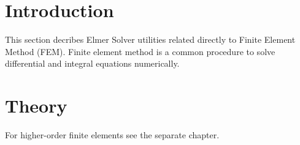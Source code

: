 \noindent

\section{Introduction}

This section decribes Elmer Solver utilities related directly to Finite Element Method (FEM).
Finite element method is a common procedure to solve differential and integral equations numerically.


\section{Theory}


For higher-order finite elements see the separate chapter.
